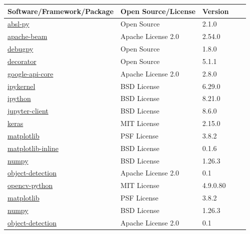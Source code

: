 \begin{table}[h!]
	\centering
	\begin{tabular}{|p{6cm}|p{3cm}|p{2.5cm}|@{}p{2.2cm}@{}|p{4cm}|}
		\hline
		\rowcolor{lightgray} \textbf{Software/Framework/Package} & \textbf{Open Source/License} & \textbf{Version} \\
		\hline
		\href{https://pypi.org/project/absl-py/}{absl-py} & Open Source & 2.1.0 \\
		\hline
		\href{https://pypi.org/project/apache-beam/}{apache-beam} & Apache License 2.0 & 2.54.0 \\
		\hline
		\href{https://pypi.org/project/debugpy/}{debugpy} & Open Source & 1.8.0 \\
		\hline
		\href{https://pypi.org/project/decorator/}{decorator} & Open Source & 5.1.1 \\
		\hline
		\href{https://pypi.org/project/google-api-core/}{google-api-core} & Apache License 2.0 & 2.8.0 \\
		\hline
		\href{https://pypi.org/project/ipykernel/}{ipykernel} & BSD License & 6.29.0 \\
		\hline
		\href{https://pypi.org/project/ipython/}{ipython} & BSD License & 8.21.0 \\
		\hline
		\href{https://pypi.org/project/jupyter-client/}{jupyter-client} & BSD License & 8.6.0 \\
		\hline
		\href{https://pypi.org/project/keras/}{keras} & MIT License & 2.15.0 \\
		\hline
		\href{https://pypi.org/project/matplotlib/}{matplotlib} & PSF License & 3.8.2 \\
		\hline
		\href{https://pypi.org/project/matplotlib-inline/}{matplotlib-inline} & BSD License & 0.1.6 \\
		\hline
		\href{https://pypi.org/project/numpy/}{numpy} & BSD License & 1.26.3 \\
		\hline
		\href{https://pypi.org/project/object-detection/}{object-detection} & Apache License 2.0 & 0.1 \\
		\hline
		\href{https://pypi.org/project/opencv-python/}{opencv-python} & MIT License & 4.9.0.80 \\
		\hline
		\href{https://pypi.org/project/matplotlib/}{matplotlib} & PSF License & 3.8.2 \\
		\hline
		\href{https://pypi.org/project/numpy/}{numpy} & BSD License & 1.26.3 \\
		\hline
		\href{https://pypi.org/project/object-detection/}{object-detection} & Apache License 2.0 & 0.1 \\

\end{tabular}
\end{table}
